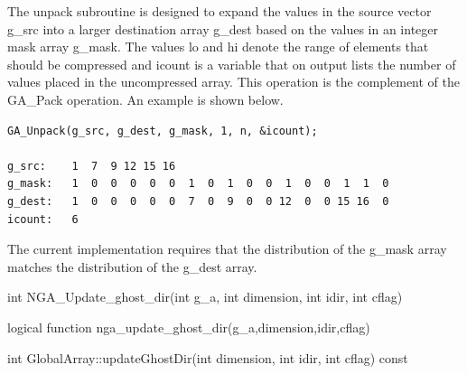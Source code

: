\documentclass[12pt]{article}
\begin{document}
\begin{desc}
The unpack subroutine is designed to expand the values in the source vector
g_src into a larger destination array g_dest based on the values in an integer
mask array g_mask. The values lo and hi denote the range of elements that
should be compressed and icount is a variable that on output lists the number
of values placed in the uncompressed array. This operation is the complement of
the GA_Pack operation. An example is shown below.
\begin{verbatim}
GA_Unpack(g_src, g_dest, g_mask, 1, n, &icount);

g_src:    1  7  9 12 15 16
g_mask:   1  0  0  0  0  0  1  0  1  0  0  1  0  0  1  1  0
g_dest:   1  0  0  0  0  0  7  0  9  0  0 12  0  0 15 16  0
icount:   6

\end{verbatim}

The current implementation requires that the distribution of the g_mask array
matches the distribution of the g_dest array.
\end{desc}


\begin{capi}
\begin{ccode}
int NGA_Update_ghost_dir(int g_a, int dimension, int idir, int cflag)
\end{ccode}
\begin{funcargs}
\end{funcargs}
\end{capi}

\begin{fapi}
\begin{fcode}
logical function nga_update_ghost_dir(g_a,dimension,idir,cflag)
\end{fcode}
\begin{funcargs}
\end{funcargs}
\end{fapi}

\begin{cxxapi}
\begin{cxxcode}
int GlobalArray::updateGhostDir(int dimension, int idir, int cflag) const
\end{cxxcode}
\begin{funcargs}
\end{funcargs}
\end{cxxapi}
\end{document}
